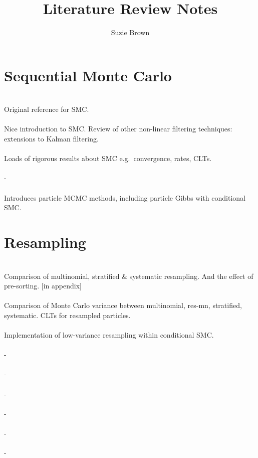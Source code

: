 \documentclass{article}
\title{Literature Review Notes}
\author{Suzie Brown}
\begin{document}
\maketitle

\section*{Sequential Monte Carlo}

\textbf{\citet{gordon1993}}\\
Original reference for SMC.
\\[5pt]
\textbf{\citet{kitagawa1996}}\\
Nice introduction to SMC. Review of other non-linear filtering techniques: extensions to Kalman filtering.
\\[5pt]
\textbf{\citet{delmoral2013}}\\
Loads of rigorous results about SMC e.g.\ convergence, rates, CLTs.
\\[5pt]
\textbf{\citet{doucet2009}}\\
-
\\[5pt]
\textbf{\citet{andrieu2010}}\\
Introduces particle MCMC methods, including particle Gibbs with conditional SMC.

\section*{Resampling}

\textbf{\citet{kitagawa1996}}\\
Comparison of multinomial, stratified \& systematic resampling. And the effect of pre-sorting. [in appendix]
\\[5pt]
\textbf{\citet{douc2005}}\\
Comparison of Monte Carlo variance between multinomial, res-mn, stratified, systematic. CLTs for resampled particles.
\\[5pt]
\textbf{\citet{lee2019}}\\
Implementation of low-variance resampling within conditional SMC.
\\[5pt]
\textbf{\citet{murray2016}}\\
-
\\[5pt]
\textbf{\citet{whitley1994}}\\
-
\\[5pt]
\textbf{\citet{carpenter1999}}\\
-
\\[5pt]
\textbf{\citet{gerber2017}}\\
-
\\[5pt]
\textbf{\citet{li2020}}\\
-
\\[5pt]
\textbf{\citet{delmoral2012}}\\
-
\end{document}
